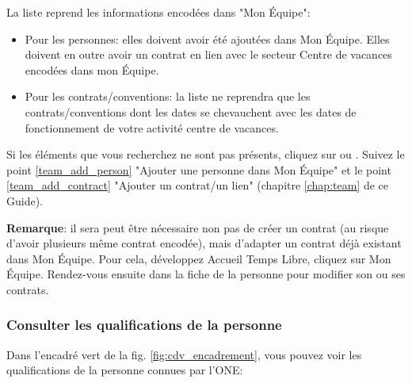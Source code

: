 \vspace*{4mm}
\begin{tcolorbox}[title=La personne ou le contrat/convention de celle-ci n'apparaît pas dans la liste]
La liste reprend les informations encodées dans "Mon Équipe":
\begin{itemize}
    \item Pour les personnes: elles doivent avoir été ajoutées dans Mon Équipe. Elles doivent en outre avoir un contrat en lien avec le secteur Centre de vacances encodées dans mon Équipe.
    \item Pour les contrats/conventions: la liste ne reprendra que les contrats/conventions dont les dates se chevauchent avec les dates de fonctionnement de votre activité centre de vacances.
\end{itemize}

Si les éléments que vous recherchez ne sont pas présents, cliquez sur  ou . Suivez le point \ref{team_add_person} "Ajouter une personne dans Mon Équipe" et le point \ref{team_add_contract} "Ajouter un contrat/un lien" (chapitre \ref{chap:team} de ce Guide). 

\textbf{Remarque}: il sera peut être nécessaire non pas de créer un contrat (au risque d'avoir plusieurs même contrat encodée), mais d'adapter un contrat déjà existant dans Mon Équipe. Pour cela, développez Accueil Temps Libre, cliquez sur Mon Équipe. Rendez-vous ensuite dans la fiche de la personne pour modifier son ou ses contrats.  
\end{tcolorbox}


\subsubsection{Consulter les qualifications de la personne}
Dans l'encadré \textcolor{vert}{vert} de la fig. \ref{fig:cdv_encadrement}, vous pouvez voir les qualifications de la personne connues par l'ONE:

